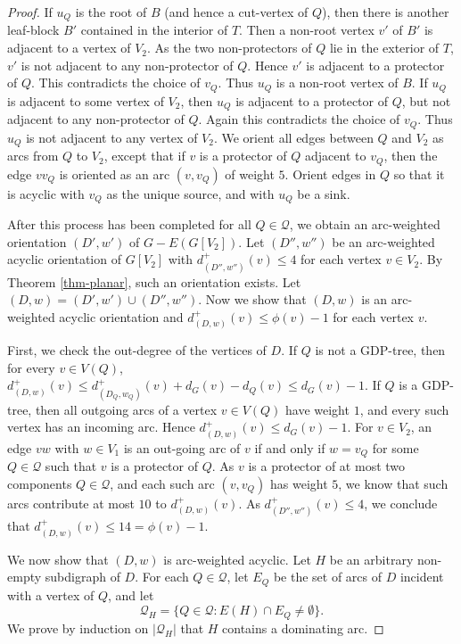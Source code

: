 \documentclass[11pt,a4paper]{article}
\theoremstyle{definition}
\begin{document}
\begin{proof}
If $u_Q$ is the root of $B$ (and hence a cut-vertex of $Q$), then there is another leaf-block $B'$ 
contained in the 
interior of $T$. Then a non-root vertex $v'$ of $B'$ is adjacent to a vertex of $V_2$. As the two non-protectors 
of $Q$ lie in the exterior of $T$, $v'$ is not adjacent to any non-protector of $Q$. Hence $v'$ is adjacent to a protector of $Q$. This contradicts the choice of $v_Q$. Thus $u_Q$ is a non-root vertex of $B$. If $u_Q$ is adjacent to some vertex of $V_2$, then $u_Q$ is adjacent to a protector of $Q$, but not adjacent to any non-protector of $Q$. Again 
this contradicts the choice of $v_Q$. Thus $u_Q$ is not adjacent to any vertex of $V_2$.
We orient all edges between $Q$ and $V_2$ as arcs from $Q$ to $V_2$, except that if $v$ is a protector of $Q$ adjacent to $v_Q$, then the edge $vv_Q$ is oriented as an arc $(v, v_Q)$ of weight $5$. 
Orient edges in $Q$ so that it is acyclic with $v_Q$ as the unique source, and with $u_Q$ be a sink.

\medskip


After this process has been completed for all $Q \in \mathcal{Q}$, we obtain an arc-weighted orientation $(D',w')$ of $G-E(G[V_2])$. Let $(D'',w'')$ be an arc-weighted acyclic orientation of $G[V_2]$ with $d_{(D'',w'')}^+(v) \le 4$ for each vertex $v \in V_2$. By Theorem \ref{thm-planar}, such an orientation exists. Let $(D,w) =(D',w') \cup (D'',w'')$. 
Now we show that $(D,w)$ is an arc-weighted acyclic orientation and $d_{(D,w)}^+(v) \le \phi(v)-1$ for each vertex $v$. 

First, we check the out-degree of the vertices of $D$. If $Q$ is not a GDP-tree, then for every $v\in V(Q)$,
$d^+_{(D,w)}(v)
 \le d^+_{(D_Q,w_Q)}(v)+d_G(v)-d_Q(v)
 \le d_G(v)-1$.
If $Q$ is a GDP-tree, then all outgoing arcs of a vertex $v\in V(Q)$ have weight $1$, and every such vertex has an incoming arc. Hence $d^+_{(D,w)}(v)\le d_G(v)-1$. For $v \in V_2$, an edge $v w$ with $w\in V_1$ is an out-going arc of $v$ if and only if $w=v_Q$ for some $Q \in \mathcal{Q}$ such that $v$ is a protector of $Q$. As $v$ is a protector of at most two components $Q \in \mathcal{Q}$, and each such arc $(v, v_Q)$ has weight $5$, we know that such arcs contribute at most $10$ to $d_{(D,w)}^+(v)$. As $d_{(D'',w'')}^+(v) \le 4$, we conclude that  $d_{(D,w)}^+(v) \le 14 = \phi(v)-1$.


We now show that $(D,w)$ is arc-weighted acyclic. Let $H$ be an arbitrary non-empty subdigraph of $D$. For each $Q\in\mathcal Q$, let $E_Q$ be the set of arcs of $D$ incident with a vertex of $Q$,
and let
$$\mathcal Q_H=
\{Q\in\mathcal Q:E(H)\cap E_Q\ne\emptyset\}.$$
We prove by induction on $|\mathcal Q_H|$ that $H$ contains a dominating arc.


\end{proof}
\end{document}
